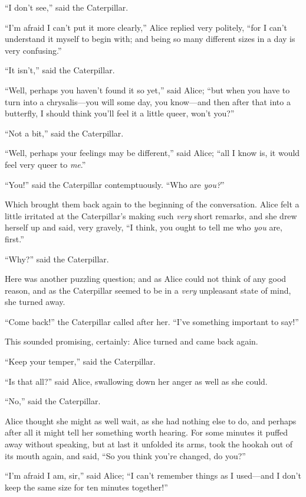 \documentclass[11pt,openany,oneside]{book}
\begin{document}
“I don’t see,” said the Caterpillar. 

“I’m afraid I can’t put it more clearly,” Alice replied very politely, “for I can’t understand it myself to begin with; and being so many different sizes in a day is very confusing.” 

“It isn’t,” said the Caterpillar. 

“Well, perhaps you haven’t found it so yet,” said Alice; “but when you have to turn into a chrysalis—you will some day, you know—and then after that into a butterfly, I should think you’ll feel it a little queer, won’t you?” 

“Not a bit,” said the Caterpillar. 

“Well, perhaps your feelings may be different,” said Alice; “all I know is, it would feel very queer to {\em me\/}.” 

“You!” said the Caterpillar contemptuously. “Who are {\em you?\/}” 

Which brought them back again to the beginning of the conversation. Alice felt a little irritated at the Caterpillar’s making such {\em very\/} short remarks, and she drew herself up and said, very gravely, “I think, you ought to tell me who {\em you\/} are, first.” 

“Why?” said the Caterpillar. 

Here was another puzzling question; and as Alice could not think of any good reason, and as the Caterpillar seemed to be in a {\em very\/} unpleasant state of mind, she turned away. 

“Come back!” the Caterpillar called after her. “I’ve something important to say!” 

This sounded promising, certainly: Alice turned and came back again. 

“Keep your temper,” said the Caterpillar. 

“Is that all?” said Alice, swallowing down her anger as well as she could. 

“No,” said the Caterpillar. 

Alice thought she might as well wait, as she had nothing else to do, and perhaps after all it might tell her something worth hearing. For some minutes it puffed away without speaking, but at last it unfolded its arms, took the hookah out of its mouth again, and said, “So you think you’re changed, do you?” 

“I’m afraid I am, sir,” said Alice; “I can’t remember things as I used—and I don’t keep the same size for ten minutes together!” 
\end{document}
